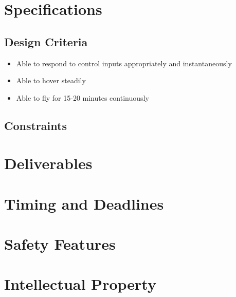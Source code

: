 \documentclass[draft]{article}
\begin{document}
\section{Specifications}
\subsection{Design Criteria}
\begin{itemize}
	\item Able to respond to control inputs appropriately and instantaneously 
	\item Able to hover steadily 
	\item Able to fly for 15-20 minutes continuously
\end{itemize}
\subsection{Constraints}
\section{Deliverables}
\section{Timing and Deadlines}
\section{Safety Features}
\section{Intellectual Property}

\end{document}
